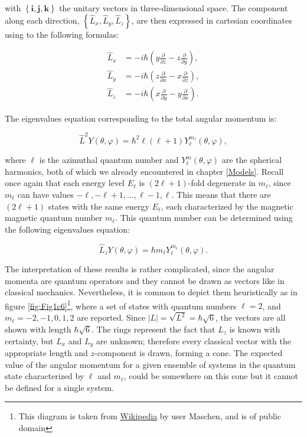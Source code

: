 \documentclass[
  9pt,
]{extbook}
\theoremstyle{definition}
\theoremstyle{definition}
\theoremstyle{definition}
\theoremstyle{remark}
\begin{document}
with \(\left\{\mathbf{i},\mathbf{j},\mathbf{k}\right\}\) the unitary vectors in three-dimensional space. The component along each direction, \(\left\{\hat{L}_x,\hat{L}_y,\hat{L}_z\right\}\), are then expressed in cartesian coordinates using to the following formulas:

\begin{equation}
\begin{aligned}
\hat{L}_x &= -i\hbar\left(y\frac{\partial}{\partial z} - z \frac{\partial}{\partial y} \right), \\
\hat{L}_y &= -i \hbar \left(z\frac{\partial}{\partial x} - x \frac{\partial}{\partial z} \right), \\
\hat{L}_z &= -i \hbar \left(x\frac{\partial}{\partial y} - y \frac{\partial}{\partial x} \right).
\end{aligned}
\label{eq:angmom2}    
\end{equation}

The eigenvalues equation corresponding to the total angular momentum is:

\begin{equation}
\hat{L}^2 Y(\theta, \varphi) =
\hbar^2 \ell(\ell+1) Y_{\ell}^{m_{\ell}}(\theta, \varphi),
\label{eq:angmom3}
\end{equation}

where \(\ell\) is the azimuthal quantum number and \(Y_{\ell}^m(\theta, \varphi)\) are the spherical harmonics, both of which we already encountered in chapter \ref{Models}. Recall once again that each energy level \(E_{\ell}\) is \((2\ell+1)\)-fold degenerate in \(m_{\ell}\), since \(m_{\ell}\) can have values \(-\ell, -\ell+1, \ldots, \ell-1, \ell\). This means that there are \((2\ell+1)\) states with the same energy \(E_{\ell}\), each characterized by the magnetic magnetic quantum number \(m_{\ell}\). This quantum number can be determined using the following eigenvalues equation:

\begin{equation}
\hat{L}_z Y(\theta, \varphi) =
\hbar m_{\ell} Y_{\ell}^{m_{\ell}}(\theta, \varphi).
\label{eq:angmom4}
\end{equation}

The interpretation of these results is rather complicated, since the angular momenta are quantum operators and they cannot be drawn as vectors like in classical mechanics. Nevertheless, it is common to depict them heuristically as in figure \ref{fig:Fig1c6}\footnote{This diagram is taken from \href{https://en.wikipedia.org/wiki/Angular_momentum_operator\#/media/File:Vector_model_of_orbital_angular_momentum.svg}{Wikipedia} by user Maschen, and is of public domain}, where a set of states with quantum numbers \(\ell =2\), and \(m_{\ell}=-2,-1,0,1,2\) are reported. Since \(|L|={\sqrt {L^{2}}}=\hbar {\sqrt {6}}\), the vectors are all shown with length \(\hbar \sqrt{6}\). The rings represent the fact that \(L_{z}\) is known with certainty, but \(L_{x}\) and \(L_{y}\) are unknown; therefore every classical vector with the appropriate length and \(z\)-component is drawn, forming a cone. The expected value of the angular momentum for a given ensemble of systems in the quantum state characterized by \(\ell\) and \(m_{\ell}\), could be somewhere on this cone but it cannot be defined for a single system.
\end{document}
